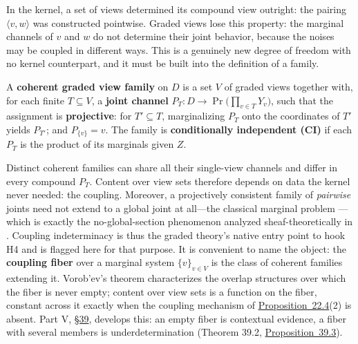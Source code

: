 In the kernel, a set of views determined its compound view outright: the pairing \(\langle v, w \rangle\) was constructed pointwise. Graded views lose this property: the marginal channels of \(v\) and \(w\) do not determine their joint behavior, because the noises may be coupled in different ways. This is a genuinely new degree of freedom with no kernel counterpart, and it must be built into the definition of a family.

\begin{thmdef}

A \textbf{coherent graded view family} on \(D\) is a set \(V\) of graded views together with, for each finite \(T \subseteq V\), a \textbf{joint channel} \(P_T : D \to \Pr\big(\prod_{v \in T} Y_v\big)\), such that the assignment is \textbf{projective}: for \(T' \subseteq T\), marginalizing \(P_T\) onto the coordinates of \(T'\) yields \(P_{T'}\); and \(P_{\{v\}} = v\). The family is \textbf{conditionally independent (CI)} if each \(P_T\) is the product of its marginals given \(Z\).
\end{thmdef}

\begin{thmrem}

Distinct coherent families can share all their single-view channels and differ in every compound \(P_T\). Content over view sets therefore depends on data the kernel never needed: the coupling. Moreover, a projectively consistent family of \emph{pairwise} joints need not extend to a global joint at all---\hspace{0pt}the classical marginal problem \autocite{vorobev1962}---\hspace{0pt}which is exactly the no-global-section phenomenon analyzed sheaf-theoretically in \autocite{abramsky2011}. Coupling indeterminacy is thus the graded theory's native entry point to hook H4 and is flagged here for that purpose. It is convenient to name the object: the \textbf{coupling fiber} over a marginal system \(\{v\}_{v \in V}\) is the class of coherent families extending it. Vorob'ev's theorem characterizes the overlap structures over which the fiber is never empty; content over view sets is a function on the fiber, constant across it exactly when the coupling mechanism of \hyperlink{stmt:22.4}{Proposition~22.4}(2) is absent. Part V, \hyperlink{sec:39}{§39}, develops this: an empty fiber is contextual evidence, a fiber with several members is underdetermination (Theorem 39.2, \hyperlink{stmt:39.3}{Proposition~39.3}).
\end{thmrem}

